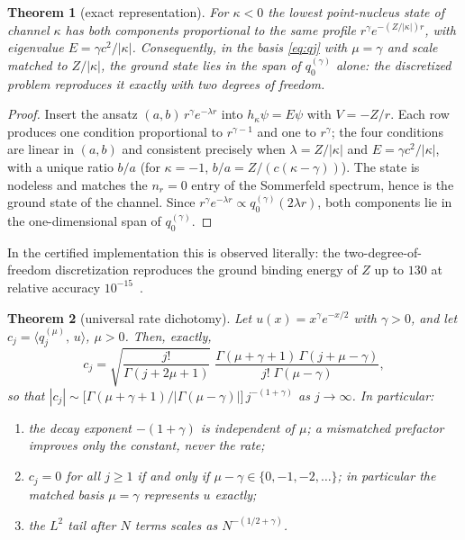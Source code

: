 \documentclass[11pt,reqno]{amsart}
\newtheorem{theorem}{Theorem}[section]
\theoremstyle{definition}
\theoremstyle{remark}
\newcommand{\ip}[2]{\langle #1,\,#2\rangle}
\begin{document}
\begin{theorem}[exact representation]\label{thm:exact}
For $\kappa<0$ the lowest point-nucleus state of channel $\kappa$ has
both components proportional to the same profile
$r^{\gamma}e^{-(Z/|\kappa|)r}$, with eigenvalue
$E=\gamma c^{2}/|\kappa|$. Consequently, in the basis \eqref{eq:qj}
with $\mu=\gamma$ and scale matched to $Z/|\kappa|$, the ground state
lies in the span of $q_{0}^{(\gamma)}$ alone: the discretized problem
reproduces it exactly with two degrees of freedom.
\end{theorem}

\begin{proof}
Insert the ansatz $(a,b)\,r^{\gamma}e^{-\lambda r}$ into
$h_{\kappa}\psi=E\psi$ with $V=-Z/r$. Each row produces one condition
proportional to $r^{\gamma-1}$ and one to $r^{\gamma}$; the four
conditions are linear in $(a,b)$ and consistent precisely when
$\lambda=Z/|\kappa|$ and $E=\gamma c^{2}/|\kappa|$, with a unique ratio
$b/a$ (for $\kappa=-1$, $b/a=Z/(c(\kappa-\gamma))$). The state is
nodeless and matches the $n_{r}=0$ entry of the Sommerfeld spectrum,
hence is the ground state of the channel. Since
$r^{\gamma}e^{-\lambda r}\propto q_{0}^{(\gamma)}(2\lambda r)$, both
components lie in the one-dimensional span of $q_{0}^{(\gamma)}$.
\end{proof}

In the certified implementation this is observed literally: the
two-degree-of-freedom discretization reproduces the ground binding
energy of $Z$ up to $130$ at relative accuracy
$10^{-15}$~\cite{companion}.

\begin{theorem}[universal rate dichotomy]\label{thm:rate}
Let $u(x)=x^{\gamma}e^{-x/2}$ with $\gamma>0$, and let
$c_{j}=\ip{q_{j}^{(\mu)}}{u}$, $\mu>0$. Then, exactly,
\begin{equation}
c_{j}=\sqrt{\frac{j!}{\Gamma(j+2\mu+1)}}\;
\frac{\Gamma(\mu+\gamma+1)\,\Gamma(j+\mu-\gamma)}
{j!\;\Gamma(\mu-\gamma)},
\label{eq:coef}
\end{equation}
so that
$|c_{j}|\sim\bigl[\Gamma(\mu+\gamma+1)/|\Gamma(\mu-\gamma)|\bigr]\,
j^{-(1+\gamma)}$ as $j\to\infty$. In particular:
\begin{enumerate}
\item[(a)] the decay exponent $-(1+\gamma)$ is independent of $\mu$;
a mismatched prefactor improves only the constant, never the rate;
\item[(b)] $c_{j}=0$ for all $j\ge1$ if and only if
$\mu-\gamma\in\{0,-1,-2,\dots\}$; in particular the matched basis
$\mu=\gamma$ represents $u$ exactly;
\item[(c)] the $L^{2}$ tail after $N$ terms scales as
$N^{-(1/2+\gamma)}$.
\end{enumerate}
\end{theorem}
\end{document}

